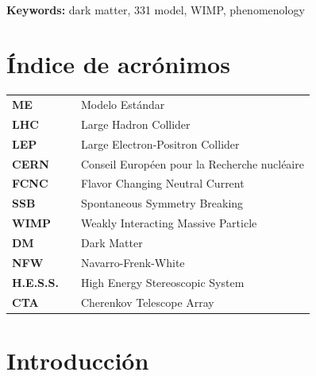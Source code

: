 \documentclass[11pt,spanish]{report}
\newcommand{\mainmatter}{
  \cleardoublepage
  \pagenumbering{arabic}
}
\renewcommand{\thefigure}{\Roman{figure}}
\begin{document}
\  \ 

\noindent
\textbf{Keywords:} dark matter, 331 model, WIMP, phenomenology




\clearpage
\tableofcontents

\clearpage
\renewcommand{\listtablename}{\hspace{2.4in} \Large Lista de Tablas}
\renewcommand{\thetable}{\Roman{table}} %
\listoftables


\clearpage
\renewcommand{\listfigurename}{\hspace{2.4in} \Large Lista de Figuras}
\renewcommand{\thefigure}{\Roman{figure}}
\listoffigures


\chapter*{Índice de acrónimos}
\begin{center}
\end{center}
\bigskip
\begin{tabular}{ l c l }

\textbf{ME} & & Modelo Estándar\\
\textbf{LHC} & & Large Hadron Collider\\
\textbf{LEP} & & Large Electron-Positron Collider\\
\textbf{CERN} & & Conseil Européen pour la Recherche nucléaire\\
\textbf{FCNC} & & Flavor Changing Neutral Current\\
\textbf{SSB} & & Spontaneous Symmetry Breaking\\
\textbf{WIMP} & & Weakly Interacting Massive Particle\\ 
\textbf{DM} & & Dark Matter \\
\textbf{NFW} & & Navarro-Frenk-White\\
\textbf{H.E.S.S.} & & High Energy Stereoscopic System \\
\textbf{CTA} & & Cherenkov Telescope Array \\
\end{tabular}


\mainmatter

\chapter*{Introducción}

\end{document}
